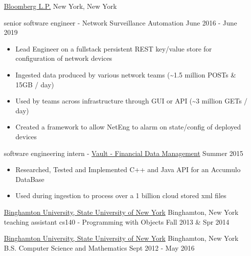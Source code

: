 \documentclass[11pt]{article}
\begin{document}
{{    }
}

\headedsection  %
{\href{http://www.bloomberg.com/company}{Bloomberg L.P.}}
{New York, New York}
{
    \headedsubsection
    {senior software engineer - Network Surveillance Automation}
    {June 2016 - June 2019}
    {
        \begin{itemize}
            \item Lead Engineer on a fullstack persistent REST key/value store for configuration of network devices
            \item Ingested data produced by various network teams (\textasciitilde{}1.5 million POSTs \& 15GB / day)
            \item Used by teams across infrastructure through GUI or API (\textasciitilde{}3 million GETs / day)
            \item Created a framework to allow NetEng to alarm on state/config of deployed devices
        \end{itemize}
    }

    \headedsubsection
    {software engineering intern - \href{https://www.bloomberg.com/professional/product/vault/}{Vault - Financial Data Management}}
    {Summer 2015}
    {
        \begin{itemize}
            \item Researched, Tested and Implemented C++ and Java API for an Accumulo DataBase
            \item Used during ingestion to process over a 1 billion cloud stored xml files
        \end{itemize}
    }
}

\headedsection  %
{\href{http://www.binghamton.edu/index.php}{Binghamton University, State University of New York}}
{Binghamton, New York}
{
    \headedsubsection
    {teaching assistant cs140 - Programming with Objects}
    {Fall 2013 \& Spr 2014}
    {
    }
}

\spacedhrule{0.2em}{0.2em}  %

\headedsection
{\href{http://www.binghamton.edu/index.php}{Binghamton University, State University of New York}}
{Binghamton, New York} {
    \headedsubsection
    {B.S. Computer Science and Mathematics}
    {Sept 2012 - May 2016}
    {}
}
\spacedhrule{0.2em}{0.2em}  %
\end{document}
